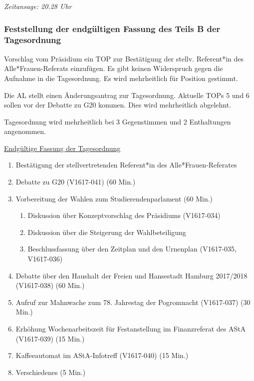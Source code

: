 \documentclass[ngerman,headheight=70pt]{scrartcl}
\begin{document}
    \textit{Zeitansage: 20.28 Uhr}

    \subsubsection{Feststellung der endgültigen Fassung des Teils B der Tagesordnung}

    Vorschlag vom Präsidium ein TOP zur Bestätigung der stellv. Referent*in des
    Alle*Frauen-Referats einzufügen.
    Es gibt keinen Widerspruch gegen die Aufnahme in die Tagesordnung.
    Es wird mehrheitlich für Position gestimmt.

    Die AL stellt einen Änderungsantrag zur Tagesordnung. Aktuelle TOPs 5 und 6
    sollen vor der Debatte zu G20 kommen. Dies wird mehrheitlich abgelehnt.

    Tagesordnung wird mehrheitlich bei 3 Gegenstimmen und 2 Enthaltungen angenommen.

    \underline{Endgültige Fassung der Tagesordnung}
    \begin{enumerate}[label={\textbf{Top \theenumi}},leftmargin=*]
        \item Bestätigung der stellvertretenden Referent*in des Alle*Frauen-Referates
        \item Debatte zu G20 (V1617-041) (60 Min.)
        \item Vorbereitung der Wahlen zum Studierendenparlament (60 Min.)
        \begin{enumerate}
            \item Diskussion über Konzeptvorschlag des Präsidiums (V1617-034)
            \item Diskussion über die Steigerung der Wahlbeteiligung
            \item Beschlussfassung über den Zeitplan und den Urnenplan
            (V1617-035, V1617-036)
        \end{enumerate}
        \item Debatte über den Haushalt der Freien und Hansestadt Hamburg
              2017/2018 (V1617-038) (60 Min.)
        \item Aufruf zur Mahnwache zum 78. Jahrestag der Pogromnacht (V1617-037) (30 Min.)
        \item Erhöhung Wochenarbeitszeit für Festanstellung im Finanzreferat des AStA (V1617-039) (15 Min.)
        \item Kaffeeautomat im AStA-Infotreff (V1617-040) (15 Min.)
        \item Verschiedenes (5 Min.)
    \end{enumerate}
\end{document}
